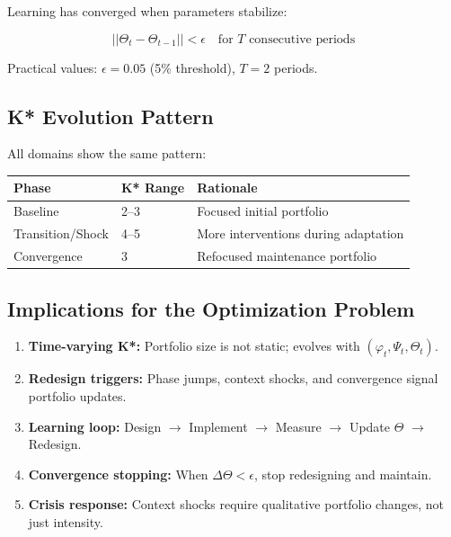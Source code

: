 Learning has converged when parameters stabilize:

\begin{equation}
\boxed{
||\Theta_t - \Theta_{t-1}|| < \epsilon \quad \text{for } T \text{ consecutive periods}
}
\label{eq:mp-convergence}
\end{equation}

Practical values: $\epsilon = 0.05$ (5\% threshold), $T = 2$ periods.

\subsection{K* Evolution Pattern}

All domains show the same pattern:

\begin{center}
\renewcommand{\arraystretch}{1.2}
\begin{tabular}{@{}lll@{}}
\toprule
\textbf{Phase} & \textbf{K* Range} & \textbf{Rationale} \\
\midrule
Baseline & 2--3 & Focused initial portfolio \\
Transition/Shock & 4--5 & More interventions during adaptation \\
Convergence & 3 & Refocused maintenance portfolio \\
\bottomrule
\end{tabular}
\end{center}

\subsection{Implications for the Optimization Problem}

\begin{enumerate}[nosep]
\item \textbf{Time-varying K*:} Portfolio size is not static; evolves with $(\varphi_t, \Psi_t, \Theta_t)$.
\item \textbf{Redesign triggers:} Phase jumps, context shocks, and convergence signal portfolio updates.
\item \textbf{Learning loop:} Design $\to$ Implement $\to$ Measure $\to$ Update $\Theta$ $\to$ Redesign.
\item \textbf{Convergence stopping:} When $\Delta\Theta < \epsilon$, stop redesigning and maintain.
\item \textbf{Crisis response:} Context shocks require qualitative portfolio changes, not just intensity.
\end{enumerate}

